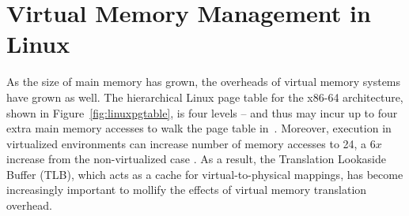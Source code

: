 %
%
%
%
%
%
%
\section{Virtual Memory Management in Linux}


As the size of main memory has grown, the overheads of virtual memory systems
have grown as well.  The hierarchical Linux page table for the x86-64
architecture, shown in Figure~\ref{fig:linuxpgtable}, 
is four levels -- and thus may incur up to four extra main memory
accesses to walk the page table in~\cite{pgtable}.
Moreover, execution in virtualized environments can increase number of memory
accesses to 24, a $6x$ increase from the non-virtualized case 
\cite{amdnested,intelept,bhargava:2008:atp}.  As a result, the Translation
Lookaside Buffer (TLB), which acts as a cache for virtual-to-physical mappings,
has become increasingly important to mollify the effects of virtual memory
translation overhead.


